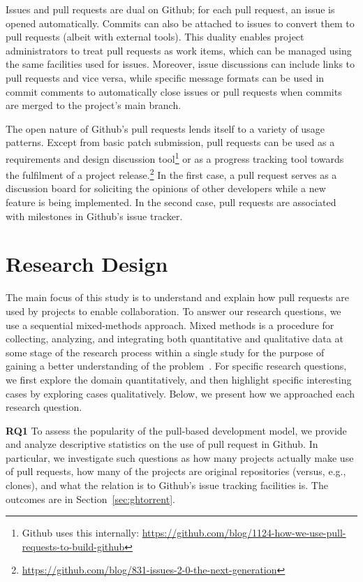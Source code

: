 \documentclass{sig-alternate}
\begin{document}
Issues and pull requests are dual on Github; for each pull request, an issue is
opened automatically. Commits can also be attached to issues to convert them to
pull requests (albeit with external tools). This duality enables project administrators to treat pull requests as work items, which can be managed using the same facilities used for issues. Moreover, issue discussions can include
links to pull requests and vice versa, while specific message formats can be used
in commit comments to automatically close issues or pull requests when commits
are merged to the project's main branch.

The open nature of Github's pull requests lends itself to a variety of usage
patterns. Except from basic patch submission, pull requests can be used as a
requirements and design discussion tool\footnote{Github uses this internally:
\url{https://github.com/blog/1124-how-we-use-pull-requests-to-build-github}} or
as a progress tracking tool towards the fulfilment of a project
release.\footnote{\url{https://github.com/blog/831-issues-2-0-the-next-generation}} In
the first case, a pull request serves as a discussion board for soliciting the
opinions of other developers while a new feature is being implemented. In the
second case, pull requests are associated with milestones in Github's issue
tracker.

\section{Research Design}

The main focus of this study is to understand and explain how pull requests are
used by projects to enable collaboration. To answer our research questions, we
use a sequential mixed-methods approach. Mixed methods is a procedure for
collecting, analyzing, and integrating both quantitative and qualitative data at
some stage of the research process within a single study for the purpose of
gaining a better understanding of the problem~\cite{Ivank06}. For specific 
research questions, we first explore the domain quantitatively,
and then highlight specific interesting cases by exploring cases qualitatively.
Below, we present how we approached each research question.

{\bfseries RQ1} To assess the popularity of the pull-based development model, we
provide and analyze descriptive statistics on the use of pull request in Github.
In particular, we investigate such questions as how many projects actually make
use of pull requests, how many of the projects are original repositories
(versus, e.g., clones), and what the relation is to Github's issue tracking
facilities is. The outcomes are in Section~\ref{sec:ghtorrent}.
\end{document}
